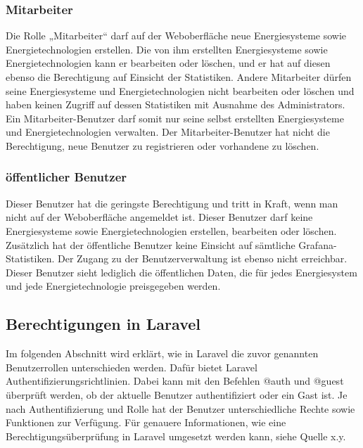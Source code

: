\subsubsection{Mitarbeiter}
Die Rolle „Mitarbeiter“ darf auf der Weboberfläche neue Energiesysteme sowie Energietechnologien erstellen. Die von ihm erstellten Energiesysteme sowie Energietechnologien kann er bearbeiten oder  löschen, und er hat auf diesen ebenso die Berechtigung auf Einsicht der Statistiken. Andere Mitarbeiter dürfen seine Energiesysteme und Energietechnologien nicht bearbeiten oder löschen und haben keinen Zugriff auf dessen Statistiken mit Ausnahme des Administrators. Ein Mitarbeiter-Benutzer darf somit nur seine selbst erstellten Energiesysteme und Energietechnologien verwalten. Der Mitarbeiter-Benutzer hat nicht die Berechtigung, neue Benutzer zu registrieren oder vorhandene zu löschen.

\subsubsection{öffentlicher Benutzer}
Dieser Benutzer hat die geringste Berechtigung und tritt in Kraft, wenn man nicht auf der Weboberfläche angemeldet ist. Dieser Benutzer darf keine Energiesysteme sowie Energietechnologien erstellen, bearbeiten oder löschen. Zusätzlich hat der öffentliche Benutzer keine Einsicht auf sämtliche Grafana-Statistiken. Der Zugang zu der Benutzerverwaltung ist ebenso nicht erreichbar. Dieser Benutzer sieht lediglich die öffentlichen Daten, die für jedes Energiesystem und jede Energietechnologie preisgegeben werden.

\subsection{Berechtigungen in Laravel}
Im folgenden Abschnitt wird erklärt, wie in Laravel die zuvor genannten Benutzerrollen unterschieden werden.
Dafür bietet Laravel Authentifizierungsrichtlinien. Dabei kann mit den Befehlen @auth und @guest überprüft werden, ob der aktuelle Benutzer authentifiziert oder ein Gast ist. Je nach Authentifizierung und Rolle hat der Benutzer unterschiedliche Rechte sowie Funktionen zur Verfügung.
Für genauere Informationen, wie eine Berechtigungsüberprüfung in Laravel umgesetzt werden kann, siehe Quelle x.y.



